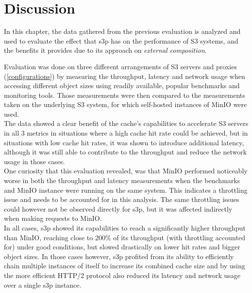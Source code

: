 \chapter{Discussion}

In this chapter, the data gathered from the previous evaluation is analyzed and used to evaluate the effect that s3p has on the performance of S3 systems, and the benefits it provides due to its approach on \textit{external composition}.

Evaluation was done on three different arrangements of S3 servers and proxies (\ref{configurations}) by measuring the throughput, latency and network usage when accessing different object sizes using readily available, popular benchmarks and monitoring tools.
Those measurements were then compared to the measurements taken on the underlying S3 system, for which self-hosted instances of MinIO were used.
\\
The data showed a clear benefit of the cache's capabilities to accelerate S3 servers in all 3 metrics in situations where a high cache hit rate could be achieved, but in situations with low cache hit rates, it was shown to introduce additional latency, although it was still able to contribute to the throughput and reduce the network usage in those cases.
\\
One curiosity that this evaluation revealed, was that MinIO performed noticeably worse in both the throughput and latency measurements when the benchmarks and MinIO instance were running on the same system. This indicates a throttling issue and needs to be accounted for in this analysis. The same throttling issues could however not be observed directly for s3p, but it was affected indirectly when making requests to MinIO.
\\
In all cases, s3p showed its capabilities to reach a significantly higher throughput than MinIO, reaching close to 200\% of its throughput (with throttling accounted for) under good conditions, but slowed drastically on lower hit rates and bigger object sizes. In those cases however, s3p profited from its ability to efficiently chain multiple instances of itself to increase its combined cache size and by using the more efficient HTTP/2 protocol also reduced its latency and network usage over a single s3p instance.

